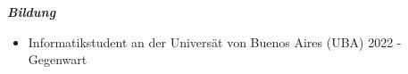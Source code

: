 \documentclass{article}
\begin{document}
\vspace{4mm}
\fontsize{12pt}{0pt}
\begin{center}
    \textit{\textbf{Bildung}}
\end{center}

\begin{itemize}
\item Informatikstudent an der Universät von Buenos Aires (UBA) \hfil 2022 - Gegenwart

\end{itemize}
\end{document}

